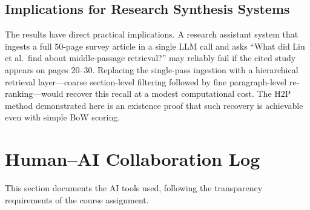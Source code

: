 \documentclass[sigconf,nonacm]{acmart}
\begin{document}
\subsection{Implications for Research Synthesis Systems}

The results have direct practical implications.
A research assistant system that ingests a full 50-page survey article in a
single LLM call and asks ``What did Liu et al.\ find about middle-passage
retrieval?'' may reliably fail if the cited study appears on pages 20--30.
Replacing the single-pass ingestion with a hierarchical retrieval layer—coarse
section-level filtering followed by fine paragraph-level re-ranking—would
recover this recall at a modest computational cost.
The H2P method demonstrated here is an existence proof that such recovery is
achievable even with simple BoW scoring.

\section{Human--AI Collaboration Log}
\label{sec:ai}

This section documents the AI tools used, following the transparency requirements
of the course assignment.
\end{document}

